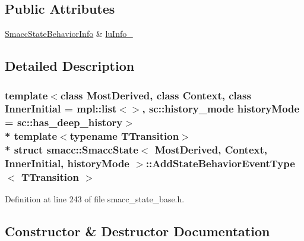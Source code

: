 \subsection*{Public Attributes}
\begin{DoxyCompactItemize}
\item 
\hyperlink{structsmacc_1_1introspection_1_1SmaccStateBehaviorInfo}{Smacc\+State\+Behavior\+Info} \& \hyperlink{structsmacc_1_1SmaccState_1_1AddStateBehaviorEventType_a982bba2f8e7058bae146bf456e633719}{lu\+Info\+\_\+}
\end{DoxyCompactItemize}


\subsection{Detailed Description}
\subsubsection*{template$<$class Most\+Derived, class Context, class Inner\+Initial = mpl\+::list$<$$>$, sc\+::history\+\_\+mode history\+Mode = sc\+::has\+\_\+deep\+\_\+history$>$\\*
template$<$typename T\+Transition$>$\\*
struct smacc\+::\+Smacc\+State$<$ Most\+Derived, Context, Inner\+Initial, history\+Mode $>$\+::\+Add\+State\+Behavior\+Event\+Type$<$ T\+Transition $>$}



Definition at line 243 of file smacc\+\_\+state\+\_\+base.\+h.



\subsection{Constructor \& Destructor Documentation}
